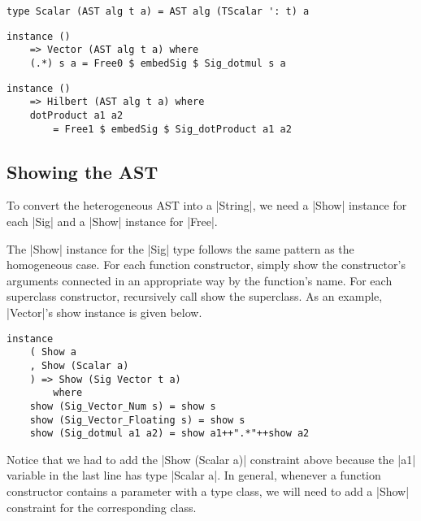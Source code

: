 \documentclass[preprint]{sigplanconf}
\theoremstyle{definition}
\begin{document}
\begin{lstlisting}
type Scalar (AST alg t a) = AST alg (TScalar ': t) a
\end{lstlisting}

\begin{lstlisting}
instance ()
    => Vector (AST alg t a) where
    (.*) s a = Free0 $ embedSig $ Sig_dotmul s a
\end{lstlisting}

\begin{lstlisting}
instance ()
    => Hilbert (AST alg t a) where
    dotProduct a1 a2
        = Free1 $ embedSig $ Sig_dotProduct a1 a2
\end{lstlisting}


\subsection{Showing the AST}

To convert the heterogeneous AST into a |String|,
we need a |Show| instance for each |Sig| and a |Show| instance for |Free|.

The |Show| instance for the |Sig| type follows the same pattern as the homogeneous case.
For each function constructor,
simply show the constructor's arguments connected in an appropriate way by the function's name.
For each superclass constructor, recursively call show the superclass.
As an example, |Vector|'s show instance is given below.
\begin{lstlisting}
instance
    ( Show a
    , Show (Scalar a)
    ) => Show (Sig Vector t a)
        where
    show (Sig_Vector_Num s) = show s
    show (Sig_Vector_Floating s) = show s
    show (Sig_dotmul a1 a2) = show a1++".*"++show a2
\end{lstlisting}
Notice that we had to add the |Show (Scalar a)| constraint above because the |a1| variable in the last line has type |Scalar a|.
In general, whenever a function constructor contains a parameter with a type class,
we will need to add a |Show| constraint for the corresponding class.
\end{document}
